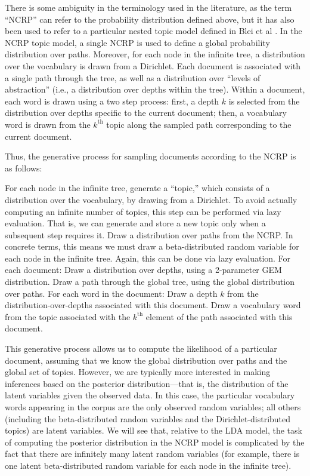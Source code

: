 \documentclass{article}
\newcommand{\nth}{^{\text{th}}}
\begin{document}
There is some ambiguity in the terminology used in the literature, as the term ``NCRP'' can refer to the probability distribution defined above, but it has also been used to refer to a particular nested topic model defined in Blei et al \cite{blei2010ncrp}.
In the NCRP topic model, a single NCRP is used to define a global probability distribution over paths.
Moreover, for each node in the infinite tree, a distribution over the vocabulary is drawn from a Dirichlet.
Each document is associated with a single path through the tree, as well as a distribution over ``levels of abstraction'' (i.e., a distribution over depths within the tree).
Within a document, each word is drawn using a two step process: first, a depth $k$ is selected from the distribution over depths specific to the current document; then, a vocabulary word is drawn from the $k\nth$ topic along the sampled path corresponding to the current document.

Thus, the generative process for sampling documents according to the NCRP is as follows:
\begin{outline}
\1 For each node in the infinite tree, generate a ``topic,'' which consists of a distribution over the vocabulary, by drawing from a Dirichlet.
To avoid actually computing an infinite number of topics, this step can be performed via lazy evaluation.
That is, we can generate and store a new topic only when a subsequent step requires it.
%
\1 Draw a distribution over paths from the NCRP.
In concrete terms, this means we must draw a beta-distributed random variable for each node in the infinite tree.
Again, this can be done via lazy evaluation.
%
\1 For each document:
  \2 Draw a distribution over depths, using a 2-parameter GEM distribution.
  \2 Draw a path through the global tree, using the global distribution over paths.
  \2 For each word in the document:
    \3 Draw a depth $k$ from the distribution-over-depths associated with this document.
    \3 Draw a vocabulary word from the topic associated with the $k\nth$ element of the path associated with this document.
\end{outline}

This generative process allows us to compute the likelihood of a particular document, assuming that we know the global distribution over paths and the global set of topics.
However, we are typically more interested in making inferences based on the posterior distribution---that is, the distribution of the latent variables given the observed data.
In this case, the particular vocabulary words appearing in the corpus are the only observed random variables; all others (including the beta-distributed random variables and the Dirichlet-distributed topics) are latent variables.
We will see that, relative to the LDA model, the task of computing the posterior distribution in the NCRP model is complicated by the fact that there are infinitely many latent random variables (for example, there is one latent beta-distributed random variable for each node in the infinite tree).
\end{document}
